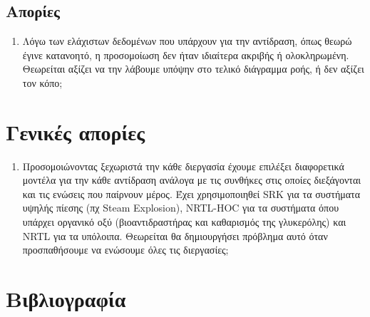\documentclass[11pt]{article}
\begin{document}
\subsection{Απορίες}
\label{sec:orgc60e421}
\begin{enumerate}
\item Λόγω των ελάχιστων δεδομένων που υπάρχουν για την αντίδραση, όπως θεωρώ έγινε κατανοητό, η προσομοίωση δεν ήταν ιδιαίτερα ακριβής ή ολοκληρωμένη. Θεωρείται αξίζει να την λάβουμε υπόψην στο τελικό διάγραμμα ροής, ή δεν αξίζει τον κόπο;
\end{enumerate}

\section{Γενικές απορίες}
\label{sec:orgc0b839a}
\begin{enumerate}
\item Προσομοιώνοντας ξεχωριστά την κάθε διεργασία έχουμε επιλέξει διαφορετικά μοντέλα για την κάθε αντίδραση ανάλογα με τις συνθήκες στις οποίες διεξάγονται και τις ενώσεις που παίρνουν μέρος. Έχει χρησιμοποιηθεί SRK για τα συστήματα υψηλής πίεσης (πχ Steam Explosion), NRTL-HOC για τα συστήματα όπου υπάρχει οργανικό οξύ (βιοαντιδραστήρας και καθαρισμός της γλυκερόλης) και NRTL για τα υπόλοιπα. Θεωρείται θα δημιουργήσει πρόβλημα αυτό όταν προσπαθήσουμε να ενώσουμε όλες τις διεργασίες;
\end{enumerate}

\section{Βιβλιογραφία}
\label{sec:org8702af4}


\end{document}
